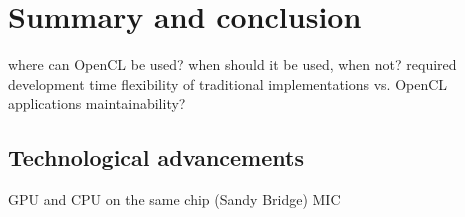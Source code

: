 \section{Summary and conclusion}




where can OpenCL be used?
when should it be used, when not?
required development time
flexibility of traditional implementations vs. OpenCL applications
maintainability?

\subsection{Technological advancements}
GPU and CPU on the same chip (Sandy Bridge)
MIC